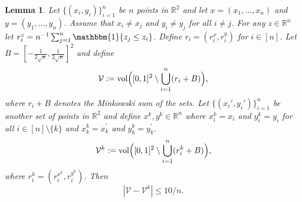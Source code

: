 \documentclass[11pt]{article}
\newtheorem{lemma}[thm]{Lemma}
\newcommand{\vol}{\mathrm{vol}}
\newcommand{\abs}[1]{| #1|}
\newcommand{\bone}{\mathbbm{1}}
\begin{document}
\begin{lemma}\label{lem:VacancyDifference}
Let $\{(x_i,y_i)\}_{i=1}^n$ be $n$ points in $\mathbb{R}^2$ and let $x = (x_1, \ldots, x_n)$ and $y = (y_1, \ldots, y_n)$. Assume that $x_i\neq x_j$ and $y_i\neq y_j$ for all $i\neq j$. For any $z\in\mathbb{R}^n$ let $r^z_i = n^{-1}\sum_{j = 1}^n \bone\{z_j \leq z_i\}$. Define $r_i = (r^x_i, r^y_i)$ for $i \in [n]$. Let $B = [-\frac{1}{2\sqrt{n}}, \frac{1}{2\sqrt{n}}]^2$ and define
\[
    \mathcal{V}:=\vol\Bigl([0,1]^2\setminus \bigcup_{i=1}^n (r_i + B)\Bigr),
\]
where $r_i + B$ denotes the Minkowski sum of the sets. Let $\{(x_i', y_i')\}_{i=1}^n$ be another set of points in $\mathbb{R}^2$ and define $x^k, y^k\in\mathbb{R}^n$ where $x^k_i = x_i$ and $y^k_i = y_i$ for all $i\in[n]\setminus\{k\}$ and $x^k_k = x_k^\prime$ and $y^k_k = y_k^\prime$. 
\[
    \mathcal{V}^k := \vol\Bigl([0,1]^2\setminus \bigcup_{i=1}^n (r_i^k + B)\Bigr),
\]
where $r_i^k = (r_i^{x^k}, r_i^{y^k})$. Then
\[
\abs{\mathcal{V} - \mathcal{V}^k} \leq 10/n.
\]
\end{lemma}
\end{document}
